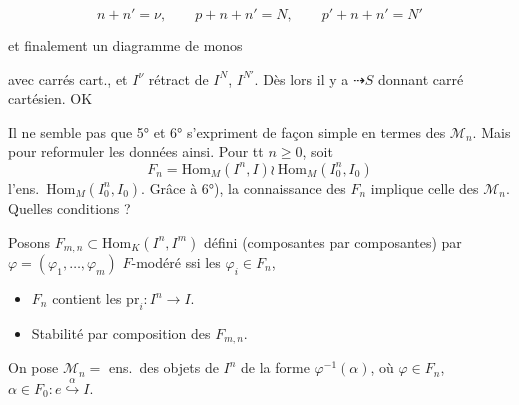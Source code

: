 \documentclass[11pt,a4paper]{article}
\begin{document}
\[
  n + n' = \nu, \qquad p + n + n' = N, \qquad p' + n + n' = N'
\]

et finalement un diagramme  de monos



avec carrés cart., et $I^{\nu}$ rétract de $I^N$, $I^{N'}$. Dès lors il y a
$\dashrightarrow S$ donnant carré cartésien. OK

Il ne semble pas que 5° et 6° s'expriment de façon simple en termes des
$\mathcal{M}_n$. Mais \ill{} \ill{} \ill{}  pour
reformuler les données ainsi. Pour tt $n \geqslant 0$, soit
\[
  F_n = \mathrm{Hom}_M(I^n, I) \wr \ \mathrm{Hom}_M(I_0^n, I_0)
\]
l'ens.\ $\mathrm{Hom}_M(I_0^n, I_0)$. Grâce à 6°), la connaissance des
$F_n$ implique celle des $\mathcal{M}_n$. Quelles conditions \ill{} ?

 Posons $F_{m,n} \subset \mathrm{Hom}_K(I^n, I^m)$ défini
(composantes par composantes) par $\varphi = (\varphi_1, \ldots,
\varphi_m)$ $F$-modéré ssi les $\varphi_i \in F_n$, \struck{\ill{}} \ill{}
\begin{itemize}
  \item[(F1)] $F_n$ contient les $\mathrm{pr}_i : I^n \to I$.
  \item[(F2)] Stabilité par composition des $F_{m,n}$.
\end{itemize}

On pose $\mathcal{M}_n =$ ens.\ des \ill{} objets de $I^n$
 de la forme
$\varphi^{-1}(\alpha)$, où $\varphi \in F_n$, $\alpha \in F_0 : e
\overset{\alpha}{\hookrightarrow} I$.
\end{document}
